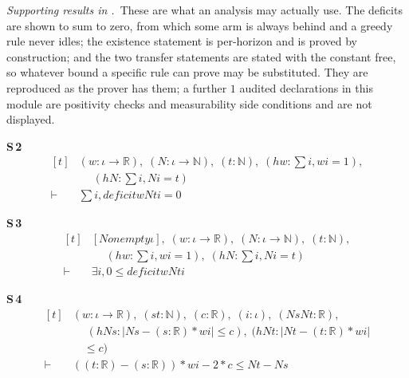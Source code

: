 \noindent\emph{Supporting results in .}~These are what an analysis may actually use. The deficits are shown to sum to zero, from which some arm is always behind and a greedy rule never idles; the existence statement is per-horizon and is proved by construction; and the two transfer statements are stated with the constant free, so whatever bound a specific rule can prove may be substituted. They are reproduced as the prover has them; a further $1$ audited declarations in this module are positivity checks and measurability side conditions and are not displayed.

\noindent\textbf{S\,2}\quad{}
{\footnotesize\[ \begin{aligned}[t]
&(\mathit{w} : \iota \to \mathbb{R} ),\; (\mathit{N} : \iota \to \mathbb{N} ),\; (\mathit{t} : \mathbb{N} ),\; (\mathit{hw} : \textstyle\sum \mathit{i}, \mathit{w} \mathit{i} = 1),\\
&\quad \; (\mathit{hN} : \textstyle\sum \mathit{i}, \mathit{N} \mathit{i} = \mathit{t})\\
\vdash\;&\textstyle\sum \mathit{i}, \mathit{deficit} \mathit{w} \mathit{N} \mathit{t} \mathit{i} = 0
\end{aligned} \]}

\noindent\textbf{S\,3}\quad{}
{\footnotesize\[ \begin{aligned}[t]
&[\mathit{Nonempty} \iota ],\; (\mathit{w} : \iota \to \mathbb{R} ),\; (\mathit{N} : \iota \to \mathbb{N} ),\; (\mathit{t} : \mathbb{N} ),\\
&\quad \; (\mathit{hw} : \textstyle\sum \mathit{i}, \mathit{w} \mathit{i} = 1),\; (\mathit{hN} : \textstyle\sum \mathit{i}, \mathit{N} \mathit{i} = \mathit{t})\\
\vdash\;&\exists \mathit{i}, 0 \leq \mathit{deficit} \mathit{w} \mathit{N} \mathit{t} \mathit{i}
\end{aligned} \]}

\noindent\textbf{S\,4}\quad{}
{\footnotesize\[ \begin{aligned}[t]
&(\mathit{w} : \iota \to \mathbb{R} ),\; (\mathit{s} \mathit{t} : \mathbb{N} ),\; (\mathit{c} : \mathbb{R} ),\; (\mathit{i} : \iota ),\; (\mathit{Ns} \mathit{Nt} : \mathbb{R} ),\\
&\quad \; (\mathit{hNs} : |\mathit{Ns} - (\mathit{s} : \mathbb{R} ) * \mathit{w} \mathit{i}| \leq \mathit{c}),\; (\mathit{hNt} : |\mathit{Nt} - (\mathit{t} : \mathbb{R} ) * \mathit{w} \mathit{i}|\\
&\quad \leq \mathit{c})\\
\vdash\;&((\mathit{t} : \mathbb{R} ) - (\mathit{s} : \mathbb{R} )) * \mathit{w} \mathit{i} - 2 * \mathit{c} \leq \mathit{Nt} - \mathit{Ns}
\end{aligned} \]}

